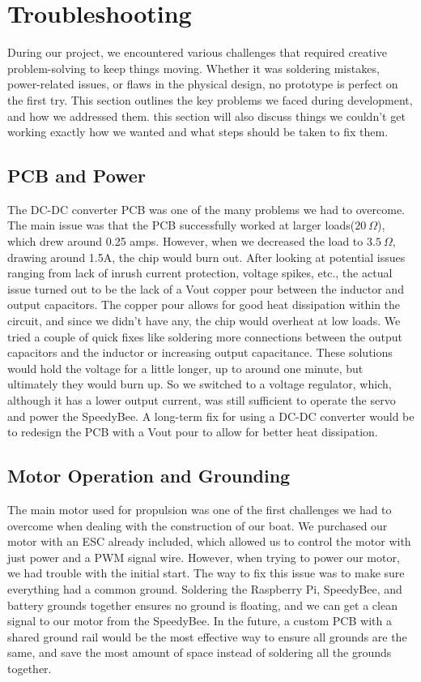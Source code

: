\section{Troubleshooting}
During our project, we encountered various challenges that required creative problem-solving to keep things moving. Whether it was soldering mistakes, power-related issues, or flaws in the physical design, no prototype is perfect on the first try. This section outlines the key problems we faced during development, and how we addressed them. this section will also discuss things we couldn't get working exactly how we wanted and what steps should be taken to fix them.
\subsection{PCB and Power}
The DC-DC converter PCB was one of the many problems we had to overcome. The main issue was that the PCB successfully worked at larger loads($20~\Omega$), which drew around 0.25 amps. However, when we decreased the load to $3.5~\Omega$, drawing around 1.5A, the chip would burn out. After looking at potential issues ranging from lack of inrush current protection, voltage spikes, etc., the actual issue turned out to be the lack of a Vout copper pour between the inductor and output capacitors. The copper pour allows for good heat dissipation within the circuit, and since we didn't have any, the chip would overheat at low loads. We tried a couple of quick fixes like soldering more connections between the output capacitors and the inductor or increasing output capacitance. These solutions would hold the voltage for a little longer, up to around one minute, but ultimately they would burn up. So we switched to a voltage regulator, which, although it has a lower output current, was still sufficient to operate the servo and power the SpeedyBee. A long-term fix for using a DC-DC converter would be to redesign the PCB with a Vout pour to allow for better heat dissipation.
\subsection{Motor Operation and Grounding}
The main motor used for propulsion was one of the first challenges we had to overcome when dealing with the construction of our boat. We purchased our motor with an ESC already included, which allowed us to control the motor with just power and a PWM signal wire. However, when trying to power our motor, we had trouble with the initial start. The way to fix this issue was to make sure everything had a common ground. Soldering the Raspberry Pi, SpeedyBee, and battery grounds together ensures no ground is floating, and we can get a clean signal to our motor from the SpeedyBee. In the future, a custom PCB with a shared ground rail would be the most effective way to ensure all grounds are the same, and save the most amount of space instead of soldering all the grounds together. 
